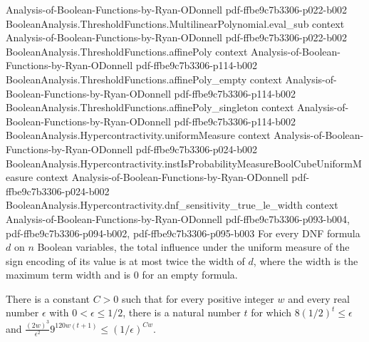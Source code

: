 \begin{lemma}
  {Analysis-of-Boolean-Functions-by-Ryan-ODonnell}
  {pdf-ffbe9c7b3306-p022-b002}
\proofstep
  {BooleanAnalysis.ThresholdFunctions.MultilinearPolynomial.eval_sub}
  {context}
  {Analysis-of-Boolean-Functions-by-Ryan-ODonnell}
  {pdf-ffbe9c7b3306-p022-b002}
\proofstep
  {BooleanAnalysis.ThresholdFunctions.affinePoly}
  {context}
  {Analysis-of-Boolean-Functions-by-Ryan-ODonnell}
  {pdf-ffbe9c7b3306-p114-b002}
\proofstep
  {BooleanAnalysis.ThresholdFunctions.affinePoly_empty}
  {context}
  {Analysis-of-Boolean-Functions-by-Ryan-ODonnell}
  {pdf-ffbe9c7b3306-p114-b002}
\proofstep
  {BooleanAnalysis.ThresholdFunctions.affinePoly_singleton}
  {context}
  {Analysis-of-Boolean-Functions-by-Ryan-ODonnell}
  {pdf-ffbe9c7b3306-p114-b002}
\proofstep
  {BooleanAnalysis.Hypercontractivity.uniformMeasure}
  {context}
  {Analysis-of-Boolean-Functions-by-Ryan-ODonnell}
  {pdf-ffbe9c7b3306-p024-b002}
\proofstep
  {BooleanAnalysis.Hypercontractivity.instIsProbabilityMeasureBoolCubeUniformMeasure}
  {context}
  {Analysis-of-Boolean-Functions-by-Ryan-ODonnell}
  {pdf-ffbe9c7b3306-p024-b002}
\proofstep
  {BooleanAnalysis.Hypercontractivity.dnf_sensitivity_true_le_width}
  {context}
  {Analysis-of-Boolean-Functions-by-Ryan-ODonnell}
  {pdf-ffbe9c7b3306-p093-b004,
    pdf-ffbe9c7b3306-p094-b002,
    pdf-ffbe9c7b3306-p095-b003}
For every DNF formula $d$ on $n$ Boolean variables, the total influence under the
uniform measure of the sign encoding of its value is at most twice the width of $d$,
where the width is the maximum term width and is $0$ for an empty formula.
\end{lemma}

\begin{lemma}
\leanok
{}
There is a constant $C>0$ such that for every positive integer $w$ and every real number
$\epsilon$ with $0<\epsilon\le 1/2$, there is a natural number $t$ for which
$8(1/2)^t\le\epsilon$ and $\frac{(2w)^3}{\epsilon^2}9^{120w(t+1)}\le(1/\epsilon)^{Cw}$.
\end{lemma}

